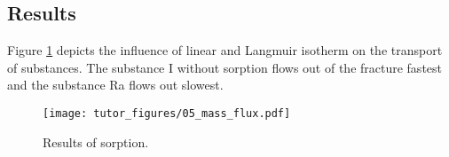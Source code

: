 \subsection{Results}

Figure \ref{fig:sorp_res} depicts the influence of linear and Langmuir
isotherm on the transport of substances. The substance I without
sorption flows out of the fracture fastest and the substance Ra flows
out slowest.

\begin{figure}
\hypertarget{fig:sorp_res}{%
\centering
\texttt{[image: tutor\_figures/05\_mass\_flux.pdf]}
\caption{Results of sorption.}\label{fig:sorp_res}
}
\end{figure}
